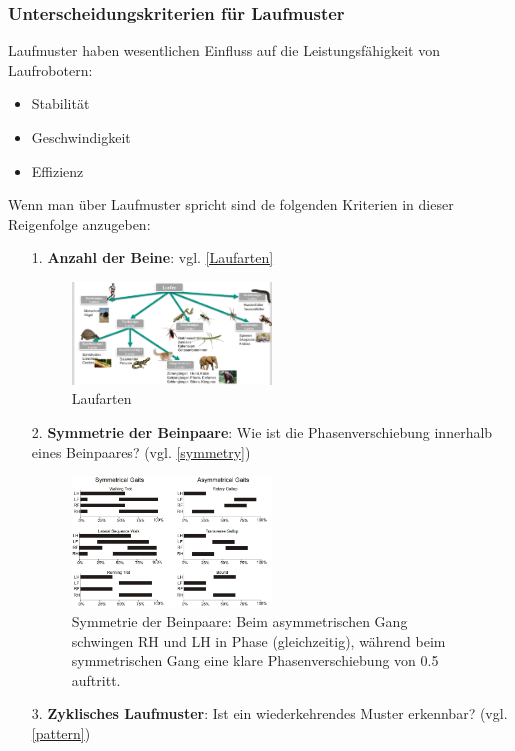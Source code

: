 \subsubsection{Unterscheidungskriterien für Laufmuster}
Laufmuster haben wesentlichen Einfluss auf die Leistungsfähigkeit von Laufrobotern:
\begin{itemize}
\item Stabilität
\item Geschwindigkeit
\item Effizienz
\end{itemize}
Wenn man über Laufmuster spricht sind de folgenden Kriterien in dieser Reigenfolge anzugeben:
\begin{itemize}
\item[1.] \textbf{Anzahl der Beine}: vgl. \autoref{Laufarten}
\begin{figure}[h!]
	\centering
	\includegraphics[width=0.5\textwidth]{figures/ch06_beinanzahl.png}
	\caption{Laufarten}
	\label{Laufarten}
\end{figure}
\item[2.] \textbf{Symmetrie der Beinpaare}: Wie ist die Phasenverschiebung innerhalb eines Beinpaares? (vgl. \autoref{symmetry})
\begin{figure}[h!]
	\centering
	\includegraphics[width=0.5\textwidth]{figures/ch06_symmetry.png}
	\caption{Symmetrie der Beinpaare: Beim asymmetrischen Gang schwingen RH und LH in Phase (gleichzeitig), während beim symmetrischen Gang eine klare Phasenverschiebung von 0.5 auftritt.}
	\label{symmetry}
\end{figure}
\item[3.] \textbf{Zyklisches Laufmuster}: Ist ein wiederkehrendes Muster erkennbar? (vgl. \autoref{pattern})

\end{itemize}
